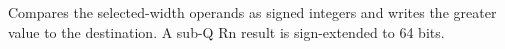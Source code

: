 Compares the selected-width operands as signed integers and writes the greater value to the destination. A sub-Q Rn result is sign-extended to 64 bits.
